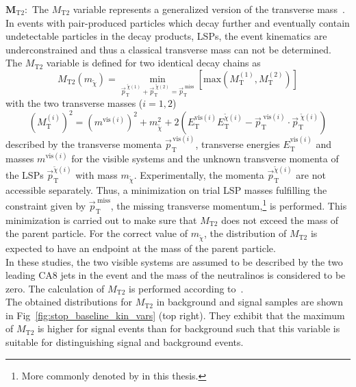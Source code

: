 \begin{description}
 \item $\mathbf{M_\mathrm{T2}:}$ The $M_\mathrm{T2}$ variable represents a generalized version of the transverse mass~\cite{Lester:1999tx, Barr:2003rg, Chatrchyan:2012jx, CMS-PAS-SUS-13-019}. In events with pair-produced particles which decay further and eventually contain undetectable particles in the decay products, \eg LSPs, the event kinematics are underconstrained and thus a classical transverse mass can not be determined. The $M_\mathrm{T2}$ variable is defined for two identical decay chains as
\begin{equation}
 M_\mathrm{T2}(m_{\tilde{\chi}}) = \min_{\vec{p}_\mathrm{T}^{\;\tilde{\chi}(1)} + \vec{p}_\mathrm{T}^{\;\tilde{\chi}(2)} = \vec{p}_\mathrm{T}^{\; \mathrm{miss}}} \left[ \mathrm{max} \left(M_\mathrm{T}^{(1)}, M_\mathrm{T}^{(2)} \right) \right] 
\end{equation} 
with the two transverse masses ($i = 1, 2$)
\begin{equation}
 (M_\mathrm{T}^{(i)})^2 = (m^{\mathrm{vis}(i)})^2 + m_{\tilde{\chi}}^2 + 2 \left( E_\mathrm{T}^{\mathrm{vis}(i)} E_\mathrm{T}^{\tilde{\chi}(i)} - \vec{p}_\mathrm{T}^{\; \mathrm{vis}(i)} \cdot \vec{p}_\mathrm{T}^{\; \tilde{\chi}(i)}   \right) 
\end{equation}
described by the transverse momenta $\vec{p}_\mathrm{T}^{\, \mathrm{vis}(i)}$, transverse energies $E_\mathrm{T}^{\mathrm{vis}(i)}$ and masses $m^{\mathrm{vis}(i)}$ for the visible systems and the unknown transverse momenta of the LSPs $\vec{p}_\mathrm{T}^{\tilde{\chi}(i)}$ with mass $m_{\tilde{\chi}}$. Experimentally, the momenta $\vec{p}_\mathrm{T}^{\tilde{\chi}(i)}$ are not accessible separately. Thus, a minimization on trial LSP masses fulfilling the constraint given by $\vec{p}_\mathrm{T}^{\; \mathrm{miss}}$, the missing transverse momentum,\footnote{More commonly denoted by \metvec in this thesis.} is performed. This minimization is carried out to make sure that $M_\mathrm{T2}$ does not exceed the mass of the parent particle. For the correct value of $m_{\tilde{\chi}}$, the distribution of $M_\mathrm{T2}$ is expected to have an endpoint at the mass of the parent particle. \\
In these studies, the two visible systems are assumed to be described by the two leading CA8 jets in the event and the mass of the neutralinos is considered to be zero. The calculation of $M_\mathrm{T2}$ is performed according to~\cite{Cheng:2008hk}. \\ 
The obtained distributions for $M_\mathrm{T2}$ in background and signal samples are shown in Fig~\ref{fig:stop_baseline_kin_vars} (top right). They exhibit that the maximum of $M_\mathrm{T2}$ is higher for signal events than for background such that this variable is suitable for distinguishing signal and background events.  

\end{description}
